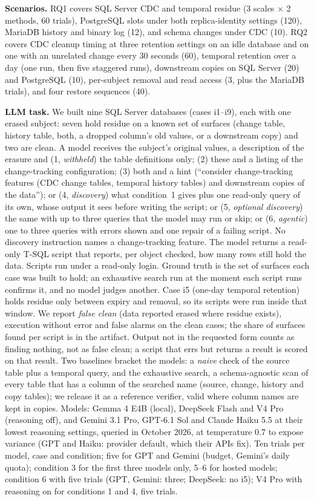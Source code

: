 \documentclass[runningheads]{llncs}
\begin{document}
\textbf{Scenarios.} RQ1 covers SQL Server CDC and temporal residue (3 scales
$\times$ 2 methods, 60 trials), PostgreSQL slots under both replica-identity
settings (120), MariaDB history and binary log (12), and schema changes under
CDC (10). RQ2 covers CDC cleanup timing at three retention settings on an idle
database and on one with an unrelated change every 30 seconds (60), temporal
retention over a day (one run, then five staggered runs), downstream copies on
SQL Server (20) and PostgreSQL (10), per-subject removal and read access (3,
plus the MariaDB trials), and four restore sequences (40).

\textbf{LLM task.} We built nine SQL Server databases (cases i1--i9), each with
one erased subject: seven hold residue on a known set of surfaces (change table, history
table, both, a dropped column's old values, or a downstream copy) and two are
clean. A model receives the subject's original values, a description of the
erasure and (1, \emph{withheld}) the table definitions only; (2) these and a listing of the
change-tracking configuration; (3) both and a hint (``consider change-tracking
features (CDC change tables, temporal history tables) and downstream copies of
the data''); or (4, \emph{discovery}) what condition~1 gives plus one read-only
query of its own, whose output it sees before writing the script; or (5,
\emph{optional discovery}) the same with up to three queries that the model may
run or skip; or (6, \emph{agentic}) one to three queries with errors shown and
one repair of a failing script. No discovery instruction names a
change-tracking feature. The model returns a
read-only T-SQL script that reports, per object checked, how many rows still
hold the data. Scripts run under a read-only login. Ground truth is the set of
surfaces each case was built to hold; an exhaustive search run at the moment
each script runs confirms it, and no model judges another. Case i5 (one-day temporal retention) holds residue only
between expiry and removal, so its scripts were run inside that window. We report
\emph{false clean} (data reported erased where residue exists), execution
without error and false alarms on the clean cases; the share of surfaces found
per script is in the artifact. Output not in the requested form counts as finding nothing, not as false
clean; a script that errs but returns a result is scored on that result. Two
baselines bracket the models: a \emph{naive} check of the source table plus a
temporal query, and the exhaustive search, a schema-agnostic scan of every table
that has a column of the searched name (source, change, history and copy
tables); we release it as a reference verifier, valid where column names are
kept in copies. Models: Gemma 4 E4B (local), DeepSeek Flash and V4 Pro
(reasoning off), and Gemini 3.1 Pro, GPT-6.1 Sol and Claude Haiku 5.5 at their
lowest reasoning settings, queried in October 2026, at temperature 0.7 to
expose variance (GPT and Haiku: provider default, which their APIs fix). Ten
trials per model, case and condition; five for GPT and Gemini (budget, Gemini's
daily quota); condition 3 for the first three models only, 5--6 for hosted
models; condition 6 with five trials (GPT, Gemini: three; DeepSeek: no i5); V4
Pro with reasoning on for conditions 1 and 4, five trials.
\end{document}
